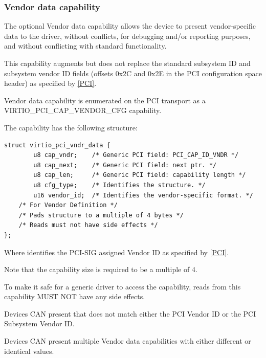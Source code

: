 \subsubsection{Vendor data capability}\label{sec:Virtio
Transport Options / Virtio Over PCI Bus / PCI Device Layout /
Vendor data capability}

The optional Vendor data capability allows the device to present
vendor-specific data to the driver, without
conflicts, for debugging and/or reporting purposes,
and without conflicting with standard functionality.

This capability augments but does not replace the standard
subsystem ID and subsystem vendor ID fields
(offsets 0x2C and 0x2E in the PCI configuration space header)
as specified by \hyperref[intro:PCI]{[PCI]}.

Vendor data capability is enumerated on the PCI transport
as a VIRTIO_PCI_CAP_VENDOR_CFG capability.

The capability has the following structure:
\begin{lstlisting}
struct virtio_pci_vndr_data {
        u8 cap_vndr;    /* Generic PCI field: PCI_CAP_ID_VNDR */
        u8 cap_next;    /* Generic PCI field: next ptr. */
        u8 cap_len;     /* Generic PCI field: capability length */
        u8 cfg_type;    /* Identifies the structure. */
        u16 vendor_id;  /* Identifies the vendor-specific format. */
	/* For Vendor Definition */
	/* Pads structure to a multiple of 4 bytes */
	/* Reads must not have side effects */
};
\end{lstlisting}

Where  identifies the PCI-SIG assigned Vendor ID
as specified by \hyperref[intro:PCI]{[PCI]}.

Note that the capability size is required to be a multiple of 4.

To make it safe for a generic driver to access the capability,
reads from this capability MUST NOT have any side effects.


Devices CAN present  that does not match
either the PCI Vendor ID or the PCI Subsystem Vendor ID.

Devices CAN present multiple Vendor data capabilities with
either different or identical  values.

